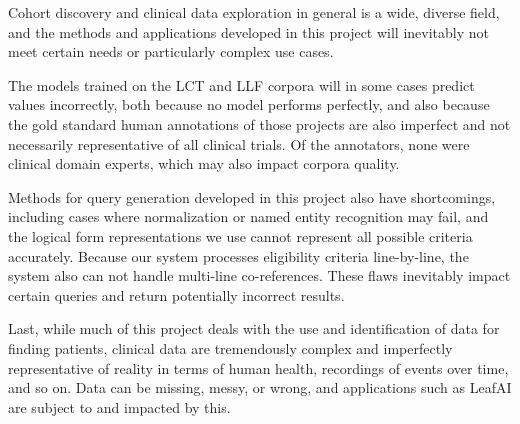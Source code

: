 \documentclass[../main.tex]{subfiles}
\begin{document}
Cohort discovery and clinical data exploration in general is a wide, diverse field, and the methods and applications developed in this project will inevitably not meet certain needs or particularly complex use cases. 

The models trained on the LCT and LLF corpora will in some cases predict values incorrectly, both because no model performs perfectly, and also because the gold standard human annotations of those projects are also imperfect and not necessarily representative of all clinical trials. Of the annotators, none were clinical domain experts, which may also impact corpora quality.

Methods for query generation developed in this project also have shortcomings, including cases where normalization or named entity recognition may fail, and the logical form representations we use cannot represent all possible criteria accurately. Because our system processes eligibility criteria line-by-line, the system also can not handle multi-line co-references. These flaws inevitably impact certain queries and return potentially incorrect results.

Last, while much of this project deals with the use and identification of data for finding patients, clinical data are tremendously complex and imperfectly representative of reality in terms of human health, recordings of events over time, and so on. Data can be missing, messy, or wrong, and applications such as LeafAI are subject to and impacted by this.
\end{document}
